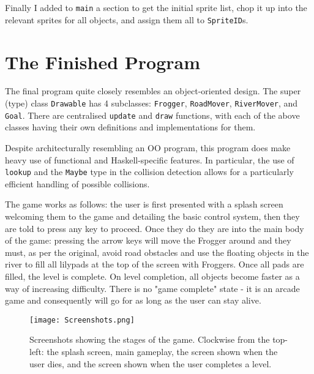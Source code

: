 \documentclass[12pt, a4paper]{report}
\begin{document}
\par

Finally I added to \verb|main| a section to get the initial sprite list, chop it up into the relevant sprites for all objects, and assign them all to \verb|SpriteID|s.

\section{The Finished Program}

The final program quite closely resembles an object-oriented design.
The super (type) class \verb|Drawable| has 4 subclasses: \verb|Frogger|, \verb|RoadMover|, \verb|RiverMover|, and \verb|Goal|.
There are centralised \verb|update| and \verb|draw| functions, with each of the above classes having their own definitions and implementations for them.

\par

Despite architecturally resembling an OO program, this program does make heavy use of functional and Haskell-specific features.
In particular, the use of \verb|lookup| and the \verb|Maybe| type in the collision detection allows for a particularly efficient handling of possible collisions.

\par

The game works as follows: the user is first presented with a splash screen welcoming them to the game and detailing the basic control system, then they are told to press any key to proceed.
Once they do they are into the main body of the game: pressing the arrow keys will move the Frogger around and they must, as per the original, avoid road obstacles and use the floating objects in the river to fill all lilypads at the top of the screen with Froggers.
Once all pads are filled, the level is complete.
On level completion, all objects become faster as a way of increasing difficulty.
There is no "game complete" state - it is an arcade game and consequently will go for as long as the user can stay alive.

\begin{figure}[ht]
  \centering
  \caption{Screenshots showing the stages of the game. Clockwise from the top-left: the splash screen, main gameplay, the screen shown when the user dies, and the screen shown when the user completes a level.}
  \texttt{[image: Screenshots.png]}
  \label{fig:screenshots}
\end{figure}
\end{document}
